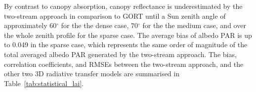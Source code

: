 
By contrast to canopy absorption, canopy reflectance is underestimated by the two-stream approach in comparison to GORT until a Sun zenith angle of approximately 60$^{\circ}$ for the the dense case, 70$^{\circ}$ for the the medium case, and over the whole zenith profile for the sparse case. The average bias of albedo PAR is up to 0.049 in the sparse case, which represents the same order of magnitude of the total averaged albedo PAR generated by the two-stream approach. The bias, correlation coefficients, and RMSEs between the two-stream approach, and the other two 3D radiative transfer models are summarised in Table~\ref{tab:statistical_lai}.

